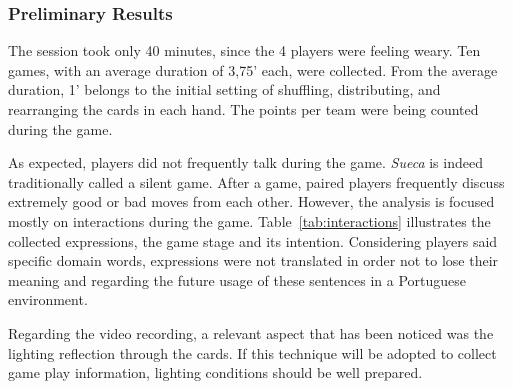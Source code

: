 \subsubsection{Preliminary Results}
The session took only 40 minutes, since the 4 players were feeling weary.
Ten games, with an average duration of 3,75' each, were collected.
From the average duration, 1' belongs to the initial setting of shuffling, distributing, and rearranging the cards in each hand.
The points per team were being counted during the game.

As expected, players did not frequently talk during the game.
\emph{Sueca} is indeed traditionally called a silent game.
After a game, paired players frequently discuss extremely good or bad moves from each other.
However, the analysis is focused mostly on interactions during the game.
Table~\ref{tab:interactions} illustrates the collected expressions, the game stage and its intention.
Considering players said specific domain words, expressions were not translated in order not to lose their meaning and regarding the future usage of these sentences in a Portuguese environment.


\begin{table}[h]
\label{tab:interactions}
\caption{Examples of expressions collected during the card game activity and its respective classification.}
\end{table}


Regarding the video recording, a relevant aspect that has been noticed was the lighting reflection through the cards.
If this technique will be adopted to collect game play information, lighting conditions should be well prepared.









